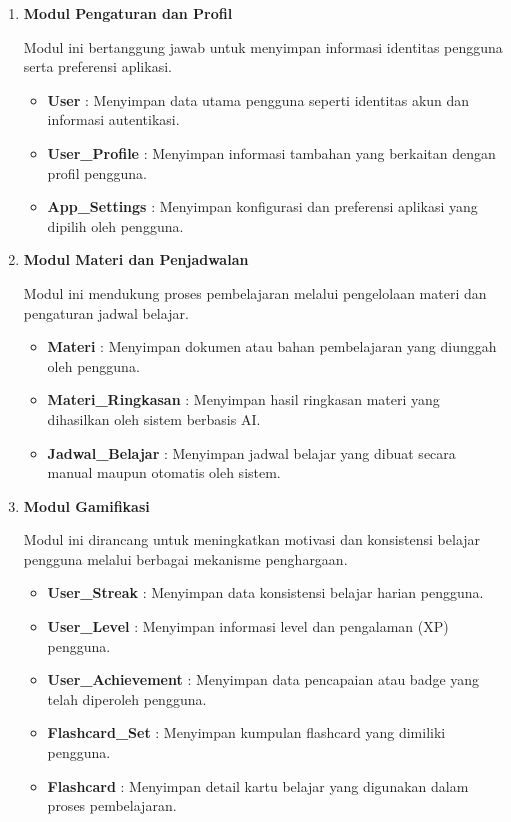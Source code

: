 \documentclass[11pt]{article}
\begin{document}
\begin{enumerate}

\item \textbf{Modul Pengaturan dan Profil}

Modul ini bertanggung jawab untuk menyimpan informasi identitas pengguna serta preferensi aplikasi.

\begin{itemize}
\item \textbf{User} : Menyimpan data utama pengguna seperti identitas akun dan informasi autentikasi.
\item \textbf{User\_Profile} : Menyimpan informasi tambahan yang berkaitan dengan profil pengguna.
\item \textbf{App\_Settings} : Menyimpan konfigurasi dan preferensi aplikasi yang dipilih oleh pengguna.
\end{itemize}

\item \textbf{Modul Materi dan Penjadwalan}

Modul ini mendukung proses pembelajaran melalui pengelolaan materi dan pengaturan jadwal belajar.

\begin{itemize}
\item \textbf{Materi} : Menyimpan dokumen atau bahan pembelajaran yang diunggah oleh pengguna.
\item \textbf{Materi\_Ringkasan} : Menyimpan hasil ringkasan materi yang dihasilkan oleh sistem berbasis AI.
\item \textbf{Jadwal\_Belajar} : Menyimpan jadwal belajar yang dibuat secara manual maupun otomatis oleh sistem.
\end{itemize}

\item \textbf{Modul Gamifikasi}

Modul ini dirancang untuk meningkatkan motivasi dan konsistensi belajar pengguna melalui berbagai mekanisme penghargaan.

\begin{itemize}
\item \textbf{User\_Streak} : Menyimpan data konsistensi belajar harian pengguna.
\item \textbf{User\_Level} : Menyimpan informasi level dan pengalaman (XP) pengguna.
\item \textbf{User\_Achievement} : Menyimpan data pencapaian atau badge yang telah diperoleh pengguna.
\item \textbf{Flashcard\_Set} : Menyimpan kumpulan flashcard yang dimiliki pengguna.
\item \textbf{Flashcard} : Menyimpan detail kartu belajar yang digunakan dalam proses pembelajaran.
\end{itemize}


\end{enumerate}
\end{document}
